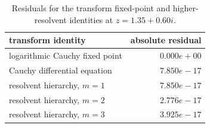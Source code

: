 \begin{table}[htbp]
\centering\small
\begin{tabular}{@{}lr@{}}
\toprule
transform identity & absolute residual\\
\midrule
logarithmic Cauchy fixed point & $0.000e+00$\\
Cauchy differential equation & $7.850e-17$\\
resolvent hierarchy, $m=1$ & $7.850e-17$\\
resolvent hierarchy, $m=2$ & $2.776e-17$\\
resolvent hierarchy, $m=3$ & $3.925e-17$\\
\bottomrule\end{tabular}
\caption{Residuals for the transform fixed-point and higher-resolvent identities at $z=1.35+0.60i$.}
\label{tab:cauchy-check}
\end{table}
